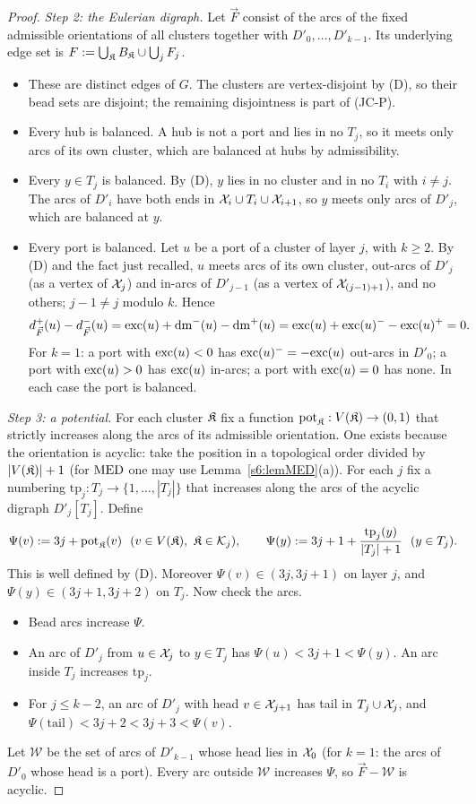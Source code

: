 \begin{proof}
\emph{Step 2: the Eulerian digraph.} Let $\vec F$ consist of the arcs of the fixed admissible orientations of all clusters together with $D'_0,\dots,D'_{k-1}$. Its underlying edge set is $F:=\bigcup_{\mathfrak{K}} B_{\mathfrak{K}}\cup\bigcup_jF_j$.
\begin{itemize}
\item These are distinct edges of $G$. The clusters are vertex-disjoint by (D), so their bead sets are disjoint; the remaining disjointness is part of (JC-P).
\item Every hub is balanced. A hub is not a port and lies in no $T_j$, so it meets only arcs of its own cluster, which are balanced at hubs by admissibility.
\item Every $y\in T_j$ is balanced. By (D), $y$ lies in no cluster and in no $T_i$ with $i\neq j$. The arcs of $D'_i$ have both ends in $\mathcal{X}_i\cup T_i\cup\mathcal{X}_{i+1}$, so $y$ meets only arcs of $D'_j$, which are balanced at $y$.
\item Every port is balanced. Let $u$ be a port of a cluster of layer $j$, with $k\ge2$. By (D) and the fact just recalled, $u$ meets arcs of its own cluster, out-arcs of $D'_j$ (as a vertex of $\mathcal{X}_j$) and in-arcs of $D'_{j-1}$ (as a vertex of $\mathcal{X}_{(j-1)+1}$), and no others; $j-1\neq j$ modulo $k$. Hence
\[
d^+_{\vec F}(u)-d^-_{\vec F}(u)=\mathrm{exc}(u)+\mathrm{dm}^-(u)-\mathrm{dm}^+(u)=\mathrm{exc}(u)+\mathrm{exc}(u)^--\mathrm{exc}(u)^+=0.
\]
For $k=1$: a port with $\mathrm{exc}(u)<0$ has $\mathrm{exc}(u)^-=-\mathrm{exc}(u)$ out-arcs in $D'_0$; a port with $\mathrm{exc}(u)>0$ has $\mathrm{exc}(u)$ in-arcs; a port with $\mathrm{exc}(u)=0$ has none. In each case the port is balanced.
\end{itemize}

\emph{Step 3: a potential.} For each cluster $\mathfrak{K}$ fix a function $\mathrm{pot}_{\mathfrak{K}}:V(\mathfrak{K})\to(0,1)$ that strictly increases along the arcs of its admissible orientation. One exists because the orientation is acyclic: take the position in a topological order divided by $|V(\mathfrak{K})|+1$ (for $\mathrm{MED}$ one may use Lemma~\ref{s6:lemMED}(a)). For each $j$ fix a numbering $\mathrm{tp}_j:T_j\to\{1,\dots,|T_j|\}$ that increases along the arcs of the acyclic digraph $D'_j[T_j]$. Define
\[
\Psi(v):=3j+\mathrm{pot}_{\mathfrak{K}}(v)\ \ (v\in V(\mathfrak{K}),\ \mathfrak{K}\in\mathcal K_j),\qquad
\Psi(y):=3j+1+\frac{\mathrm{tp}_j(y)}{|T_j|+1}\ \ (y\in T_j).
\]
This is well defined by (D). Moreover $\Psi(v)\in(3j,3j+1)$ on layer $j$, and $\Psi(y)\in(3j+1,3j+2)$ on $T_j$. Now check the arcs.
\begin{itemize}
\item Bead arcs increase $\Psi$.
\item An arc of $D'_j$ from $u\in\mathcal{X}_j$ to $y\in T_j$ has $\Psi(u)<3j+1<\Psi(y)$. An arc inside $T_j$ increases $\mathrm{tp}_j$.
\item For $j\le k-2$, an arc of $D'_j$ with head $v\in\mathcal{X}_{j+1}$ has tail in $T_j\cup\mathcal{X}_j$, and $\Psi(\text{tail})<3j+2<3j+3<\Psi(v)$.
\end{itemize}
Let $\mathcal W$ be the set of arcs of $D'_{k-1}$ whose head lies in $\mathcal{X}_0$ (for $k=1$: the arcs of $D'_0$ whose head is a port). Every arc outside $\mathcal W$ increases $\Psi$, so $\vec F-\mathcal W$ is acyclic.


\end{proof}
